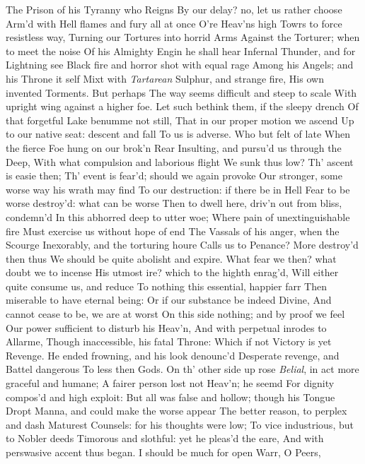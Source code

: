 \documentclass[11pt]{book}
\begin{document}
The Prison of his Tyranny who Reigns 
By our delay? no, let us rather choose 
Arm'd with Hell flames and fury all at once 
O're Heav'ns high Towrs to force resistless way, 
Turning our Tortures into horrid Arms 
Against the Torturer; when to meet the noise 
Of his Almighty Engin he shall hear 
Infernal Thunder, and for Lightning see 
Black fire and horror shot with equal rage 
Among his Angels; and his Throne it self 
Mixt with \textit{Tartarean} Sulphur, and strange fire, 
His own invented Torments.  But perhaps 
The way seems difficult and steep to scale 
With upright wing against a higher foe. 
Let such bethink them, if the sleepy drench 
Of that forgetful Lake benumme not still, 
That in our proper motion we ascend 
Up to our native seat: descent and fall 
To us is adverse.  Who but felt of late 
When the fierce Foe hung on our brok'n Rear 
Insulting, and pursu'd us through the Deep, 
With what compulsion and laborious flight 
We sunk thus low?  Th' ascent is easie then; 
Th' event is fear'd; should we again provoke 
Our stronger, some worse way his wrath may find 
To our destruction: if there be in Hell 
Fear to be worse destroy'd: what can be worse 
Then to dwell here, driv'n out from bliss, condemn'd 
In this abhorred deep to utter woe; 
Where pain of unextinguishable fire 
Must exercise us without hope of end 
The Vassals of his anger, when the Scourge 
Inexorably, and the torturing houre 
Calls us to Penance?  More destroy'd then thus 
We should be quite abolisht and expire. 
What fear we then? what doubt we to incense 
His utmost ire? which to the highth enrag'd, 
Will either quite consume us, and reduce 
To nothing this essential, happier farr 
Then miserable to have eternal being: 
Or if our substance be indeed Divine, 
And cannot cease to be, we are at worst 
On this side nothing; and by proof we feel 
Our power sufficient to disturb his Heav'n, 
And with perpetual inrodes to Allarme, 
Though inaccessible, his fatal Throne: 
Which if not Victory is yet Revenge. 
\quad He ended frowning, and his look denounc'd 
Desperate revenge, and Battel dangerous 
To less then Gods.  On th' other side up rose 
\textit{Belial}, in act more graceful and humane; 
A fairer person lost not Heav'n; he seemd 
For dignity compos'd and high exploit: 
But all was false and hollow; though his Tongue 
Dropt Manna, and could make the worse appear 
The better reason, to perplex and dash 
Maturest Counsels: for his thoughts were low; 
To vice industrious, but to Nobler deeds 
Timorous and slothful: yet he pleas'd the eare, 
And with perswasive accent thus began. 
\quad I should be much for open Warr, O Peers, 
\end{document}
